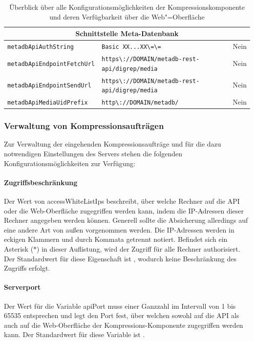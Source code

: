 \begin{table}
\begin{center}
\begin{tabular}{lll}
\hline
\multicolumn{3}{c}{Schnittstelle Meta-Datenbank} \\
\hline
{\lstinline|metadbApiAuthString|} & {\lstinline|Basic XX...XX\=\=|} & {\footnotesize Nein} \\
{\lstinline|metadbApiEndpointFetchUrl|} & {\lstinline|https\://DOMAIN/metadb-rest-api/digrep/media|} & {\footnotesize Nein} \\
{\lstinline|metadbApiEndpointSendUrl|} & {\lstinline|https\://DOMAIN/metadb-rest-api/digrep/media|} & {\footnotesize Nein} \\
{\lstinline|metadbApiMediaUidPrefix|} & {\lstinline|http\://DOMAIN/metadb/|} & {\footnotesize Nein} \\
\end{tabular}%
\caption{Überblick über alle Konfigurationsmöglichkeiten der Kompressionskomponente und deren Verfügbarkeit über die Web"=Oberfläche}
\label{schlenke:tbl:configOptions}
\end{center}
\end{table}

\subsubsection{Verwaltung von Kompressionsaufträgen}

Zur Verwaltung der eingehenden Kompressionsaufträge und für die dazu notwendigen Einstellungen des Servers stehen die folgenden Konfigurationsmöglichkeiten zur Verfügung:

\paragraph{Zugriffsbeschränkung} Der Wert von {\ttfamily access\-White\-List\-Ips} beschreibt, über welche Rechner auf die API oder die Web-Oberfläche zugegriffen werden kann, indem die IP-Adressen dieser Rechner angegeben werden können. Generell sollte die Absicherung allerdings auf eine andere Art von außen vorgenommen werden. Die IP-Adressen werden in eckigen Klammern und durch Kommata getrennt notiert. Befindet sich ein Asterisk (\glqq{}$\ast$\grqq{}) in dieser Auflistung, wird der Zugriff für alle Rechner authorisiert. Der Standardwert für diese Eigenschaft ist  {\ttfamily [127.0.0.1, *]}, wodurch keine Beschränkung des Zugriffs erfolgt.

\paragraph{Serverport} Der Wert für die Variable {\ttfamily api\-Port} muss einer Ganzzahl im Intervall von 1 bis 65535 entsprechen und legt den Port fest, über welchen sowohl auf die API als auch auf die Web-Oberfläche der Kompressions-Komponente zugegriffen werden kann. Der Standardwert für diese Variable ist {}.

